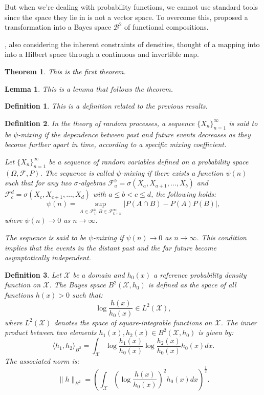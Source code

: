 \documentclass[article]{abntex2}
\newtheorem{theorem}{Theorem} %
\newtheorem{lemma}{Lemma}     %
\newtheorem{definition}{Definition} %
\begin{document}
But when we're dealing with probability functions, we cannot use standard tools since the space they lie in is not a vector space. To overcome this,  proposed a transformation into a Bayes space $\mathcal{B}^2$ of functional compositions.

, also considering the inherent constraints of densities, thought of a mapping into into a Hilbert space through a continuous and invertible map.

\begin{theorem}
This is the first theorem.
\end{theorem}

\begin{lemma}
This is a lemma that follows the theorem.
\end{lemma}

\begin{definition}
This is a definition related to the previous results.
\end{definition}

\begin{definition}
In the theory of random processes, a sequence $\{ X_n \}_{n=1}^{\infty}$ is said to be $\psi$-mixing if the dependence between past and future events decreases as they become further apart in time, according to a specific mixing coefficient.

Let $\{ X_n \}_{n=1}^{\infty}$ be a sequence of random variables defined on a probability space $(\Omega, \mathcal{F}, P)$. The sequence is called \emph{$\psi$-mixing} if there exists a function $\psi(n)$ such that for any two $\sigma$-algebras $\mathcal{F}_a^b = \sigma(X_a, X_{a+1}, \ldots, X_b)$ and $\mathcal{F}_c^d = \sigma(X_c, X_{c+1}, \ldots, X_d)$ with $a \leq b < c \leq d$, the following holds:
\[
\psi(n) = \sup_{A \in \mathcal{F}_1^k, B \in \mathcal{F}_{k+n}^\infty} |P(A \cap B) - P(A)P(B)|,
\]
where $\psi(n) \to 0$ as $n \to \infty$.

The sequence is said to be $\psi$-mixing if $\psi(n) \to 0$ as $n \to \infty$. This condition implies that the events in the distant past and the far future become asymptotically independent.
\end{definition}

\begin{definition}

Let $\mathcal{X}$ be a domain and $h_0(x)$ a reference probability density function on $\mathcal{X}$. The \emph{Bayes space} $B^2(\mathcal{X}, h_0)$ is defined as the space of all functions $h(x) > 0$ such that:
\[
\log \frac{h(x)}{h_0(x)} \in L^2(\mathcal{X}),
\]
where $L^2(\mathcal{X})$ denotes the space of square-integrable functions on $\mathcal{X}$. The inner product between two elements $h_1(x), h_2(x) \in B^2(\mathcal{X}, h_0)$ is given by:
\[
\langle h_1, h_2 \rangle_{B^2} = \int_{\mathcal{X}} \log \frac{h_1(x)}{h_0(x)} \log \frac{h_2(x)}{h_0(x)} h_0(x) dx.
\]
The associated norm is:
\[
\| h \|_{B^2} = \left( \int_{\mathcal{X}} \left( \log \frac{h(x)}{h_0(x)} \right)^2 h_0(x) dx \right)^{\frac{1}{2}}.
\]
\end{definition}
\end{document}
